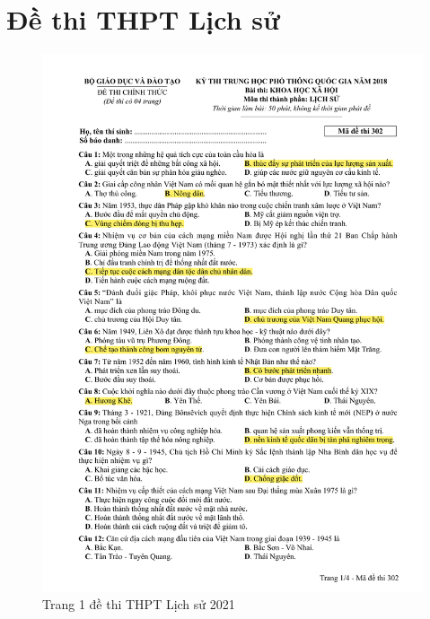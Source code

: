 \chapter{Đề thi THPT Lịch sử}
\label{chap:appendix_exam}
\begin{figure}[htbp]
    \centering
    \includegraphics[width=1\textwidth, page=1]{Appendix/Fig/2018_302.pdf}
    \caption{Trang 1 đề thi THPT Lịch sử 2021}
\end{figure}

